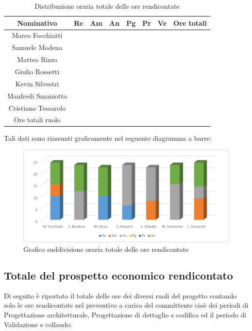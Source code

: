 \documentclass[./PianodiProgetto.tex]{subfiles}
\begin{document}
\begin{table}[H]
	\centering
	\begin{tabular}{|c|cccccc|c|}
		\hline
		Nominativo&Re&Am&An&Pg&Pr&Ve&Ore totali\\ \hline
		Marco Focchiatti& & & & & & & \\ \hline
		Samuele Modena& & & & & & & \\ \hline
		Matteo Rizzo& & & & & & & \\ \hline
		Giulio Rossetti& & & & & & & \\ \hline
		Kevin Silvestri& & & & & & & \\ \hline
		Manfredi Smaniotto& & & & & & & \\ \hline
		Cristiano Tessarolo& & & & & & & \\  \hline
		Ore totali ruolo& & & & & & & \\ \hline
	\end{tabular}
	\caption{Distribuzione oraria totale delle ore rendicontate}
\end{table}

Tali dati sono riassunti graficamente nel seguente diagramma a barre:
\begin{figure}[H]
	\centering
	\includegraphics[width=1\linewidth]{img/grafici/OreRendicontateProspettoOrario}
	\caption{Grafico suddivisione oraria totale delle ore rendicontate}
	\label{fig:ore-rendicontate-prospetto-orario}
\end{figure}

\subsection{Totale del prospetto economico rendicontato}
Di seguito è riportato il totale delle ore dei diversi ruoli del progetto contando solo le ore rendicontate nel preventivo a carico del committente cioè dei periodi di Progettazione architetturale, Progettazione di dettaglio e codifica ed il periodo di Validazione e collaudo:
\end{document}
